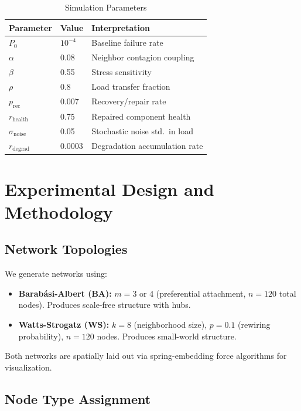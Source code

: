 \documentclass[12pt,a4paper,twoside]{report}
\begin{document}
\begin{table}[htbp]
\centering
\caption{Simulation Parameters}
\begin{tabular}{lll}
\toprule
\textbf{Parameter} & \textbf{Value} & \textbf{Interpretation} \\
\midrule
$P_0$ & $10^{-4}$ & Baseline failure rate \\
$\alpha$ & 0.08 & Neighbor contagion coupling \\
$\beta$ & 0.55 & Stress sensitivity \\
$\rho$ & 0.8 & Load transfer fraction \\
$p_{\text{rec}}$ & 0.007 & Recovery/repair rate \\
$r_{\text{health}}$ & 0.75 & Repaired component health \\
$\sigma_{\text{noise}}$ & 0.05 & Stochastic noise std.\ in load \\
$r_{\text{degrad}}$ & 0.0003 & Degradation accumulation rate \\
\bottomrule
\end{tabular}
\end{table}

\chapter{Experimental Design and Methodology}

\section{Network Topologies}

We generate networks using:
\begin{itemize}
\item \textbf{Barab\'asi-Albert (BA):} $m = 3$ or 4 (preferential attachment, $n=120$ total nodes). Produces scale-free structure with hubs.
\item \textbf{Watts-Strogatz (WS):} $k = 8$ (neighborhood size), $p = 0.1$ (rewiring probability), $n=120$ nodes. Produces small-world structure.
\end{itemize}

Both networks are spatially laid out via spring-embedding force algorithms for visualization.

\section{Node Type Assignment}
\end{document}
